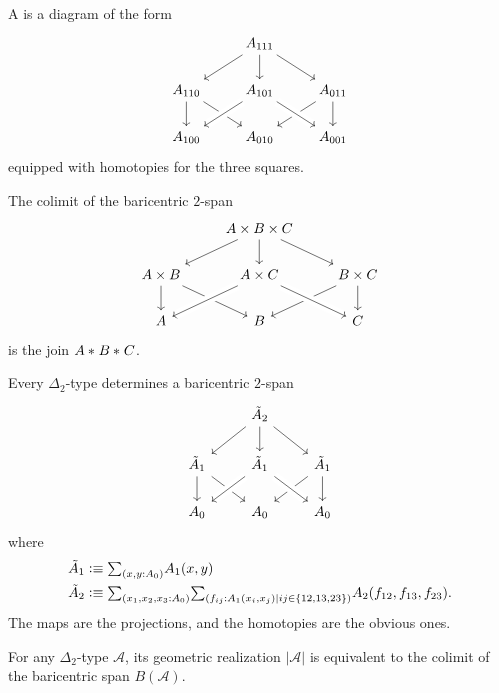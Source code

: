 \begin{defn}
A  is a diagram of the form
\begin{equation*}
\begin{tikzcd}
& A_{111} \arrow[dl] \arrow[d] \arrow[dr] \\
A_{110} \arrow[d] \arrow[dr] & A_{101} \arrow[dl,crossing over] & A_{011} \arrow[dl] \arrow[d] \\
A_{100} & A_{010} & A_{001} \arrow[from=ul,crossing over] 
\end{tikzcd}
\end{equation*}
equipped with homotopies for the three squares.
\end{defn}

\begin{eg}
The colimit of the baricentric $2$-span
\begin{equation*}
\begin{tikzcd}
& A\times B \times C \arrow[dl] \arrow[d] \arrow[dr] \\
A\times B \arrow[d] \arrow[dr] & A\times C \arrow[dl,crossing over] & B\times C \arrow[dl] \arrow[d] \\
A & B & C \arrow[from=ul,crossing over] 
\end{tikzcd}
\end{equation*}
is the join ${A}\ast_{}{{B}\ast_{}{C}}$. 
\end{eg}

\begin{defn}
Every $\Delta_2$-type determines a baricentric $2$-span
\begin{equation*}
\begin{tikzcd}
& \tilde A_2 \arrow[dl] \arrow[d] \arrow[dr] \\
\tilde A_1 \arrow[d] \arrow[dr] & \tilde A_1 \arrow[dl,crossing over] & \tilde A_1 \arrow[dl] \arrow[d] \\
A_0 & A_0 & A_0 \arrow[from=ul,crossing over] 
\end{tikzcd}
\end{equation*}
where
\begin{align*}
\tilde{A}_1 & \defeq \sm{x,y:A_0}A_1(x,y) \\
\tilde{A}_2 & \defeq \sm{x_1,x_2,x_3:A_0}{f_{ij}:A_1(x_i,x_j)\mid ij\in\{12,13,23\}} A_2(f_{12},f_{13},f_{23}).
\end{align*}
The maps are the projections, and the homotopies are the obvious ones.
\end{defn}

\begin{thm}
For any $\Delta_2$-type $\mathcal{A}$, its geometric realization $|\mathcal{A}|$ is equivalent to the colimit of the baricentric span $B(\mathcal{A})$.
\end{thm}

